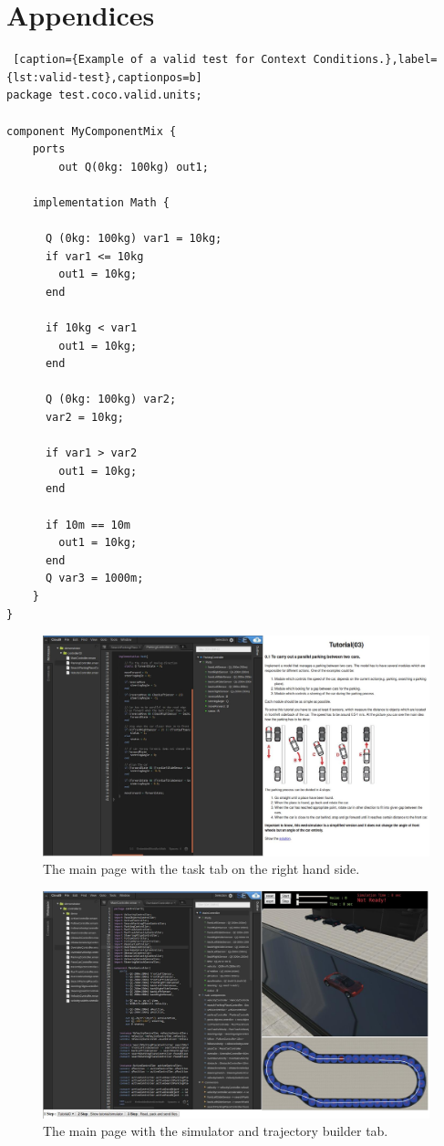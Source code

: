 \chapter*{Appendices}
\addappheadtotoc
\begin{lstlisting} [caption={Example of a valid test for Context Conditions.},label={lst:valid-test},captionpos=b]
package test.coco.valid.units;

component MyComponentMix {
    ports
        out Q(0kg: 100kg) out1;
        
    implementation Math {

      Q (0kg: 100kg) var1 = 10kg;
      if var1 <= 10kg
        out1 = 10kg;
      end

      if 10kg < var1
        out1 = 10kg;
      end
      
      Q (0kg: 100kg) var2;
      var2 = 10kg;
      
      if var1 > var2
        out1 = 10kg;
      end
      
      if 10m == 10m
        out1 = 10kg;
      end
      Q var3 = 1000m;
    }
}
\end{lstlisting}
\begin{figure}
    \centering
    \includegraphics[width=\linewidth]{src/pic/web-interface-task}
    \caption{The main page with the task tab on the right hand side.}
    \label{fig:web-interface-task}
\end{figure}
\begin{figure}
    \centering
    \includegraphics[width=\linewidth]{src/pic/web-interface}
    \caption{The main page with the simulator and trajectory builder tab.}
    \label{fig:web-interface}
\end{figure}
\cleardoublepage
